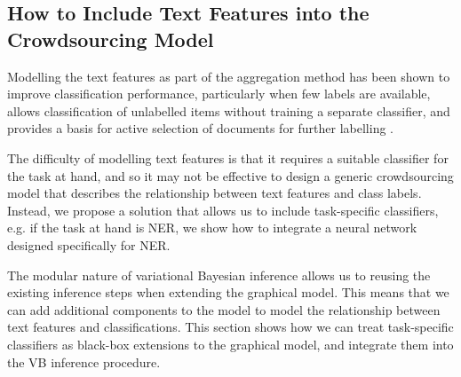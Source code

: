 \subsection{How to Include Text Features into the Crowdsourcing Model}

Modelling the text features as part of the aggregation method has been shown to improve classification performance, particularly when few labels are available, allows classification of unlabelled items without training a separate classifier, and provides a basis for active selection of documents for further labelling \cite{many many things}.

The difficulty of modelling text features is that it requires a suitable classifier for the task at hand, and so it may not be effective to design a generic crowdsourcing model that describes the relationship between text features and class labels. Instead, we propose a solution that allows us to include task-specific classifiers, e.g. if the task at hand is NER, we show how to integrate a neural network designed specifically for NER.

The modular nature of variational Bayesian inference allows us to reusing the existing inference steps when extending the graphical model. This means that we can add additional components to the model to model the relationship between text features and classifications. This section shows how we can treat task-specific classifiers as black-box extensions to the graphical model, and integrate them into the VB inference procedure. 
